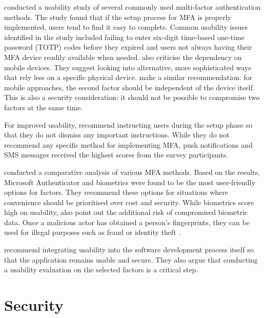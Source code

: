 \textcite{reese_usability_2019} conducted a usability study of several commonly used multi-factor authentication methods. The study found that if the setup process for MFA is properly implemented, users tend to find it easy to complete. Common usability issues identified in the study included failing to enter six-digit time-based one-time password (TOTP) codes before they expired and users not always having their MFA device readily available when needed. \textcite[5448]{das_mfa_2020} also criticise the dependency on mobile devices. They suggest looking into alternative, more sophisticated ways that rely less on a specific physical device. \textcite[21]{marky_nah_2022} make a similar recommendation:  for mobile approaches, the second factor should be independent of the device itself. This is also a security consideration: it should not be possible to compromise two factors at the same time.

For improved usability, \textcite[368]{reese_usability_2019} recommend instructing users during the setup phase so that they do not dismiss any important instructions. While they do not recommend any specific method for implementing MFA, push notifications and SMS messages received the highest scores from the survey participants.

\textcite{karim_choosing_2024} conducted a comparative analysis of various MFA methods. Based on the results, Microsoft Authenticator and biometrics were found to be the most user-friendly options for factors. They recommend these options for situations where convenience should be prioritised over cost and security. While biometrics score high on usability, \textcite[208]{karim_choosing_2024} also point out the additional risk of compromised biometric data. Once a malicious actor has obtained a person's fingerprints, they can be used for illegal purposes such as fraud or identity theft \citep[208]{karim_choosing_2024}.

\textcite[50]{grassi_digital_2017} recommend integrating usability into the software development process itself so that the application remains usable and secure. They also argue that conducting a usability evaluation on the selected factors is a critical step.


\section{Security}

